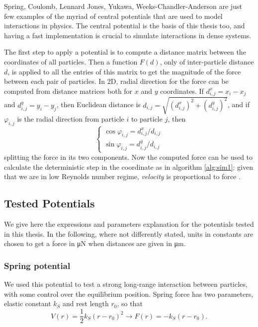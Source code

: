 \documentclass[../../master_thesis_np.tex]{subfiles}
\begin{document}
	Spring, Coulomb, Lennard Jones, Yukawa, Weeks-Chandler-Anderson are just few examples of the myriad of central potentials that are used to model interactions in physics. 
	The central potential is the basis of this thesis too, and having a fast implementation is crucial to simulate interactions in dense systems. 
	
	The first step to apply a potential is to compute a distance matrix between the coordinates of all particles. 
	Then a function $F(d)$, only of inter-particle distance $d$, is applied to all the entries of this matrix to get the magnitude of the force between each pair of particles. 
	In 2D, radial direction for the force can be computed from distance matrices both for $x$ and $y$ coordinates. 
	If $d^x_{i,j} = x_i - x_j$ and $d^y_{i,j} = y_i - y_j$, then Euclidean distance is $d_{i,j} = \sqrt{(d^x_{i,j})^2 + (d^y_{i,j})^2}$, and if $\varphi_{i,j}$ is the radial direction from particle $i$ to particle $j$, then
	\begin{equation}
		\begin{cases}
			\cos\varphi_{i,j} = d^x_{i,j}/d_{i,j}\\
			\sin\varphi_{i,j} = d^y_{i,j}/d_{i,j}
		\end{cases}
	\end{equation}
	splitting the force in its two components.
	Now the computed force can be used to calculate the deterministic step in the coordinate as in algorithm \ref{alg:sim1}: given that we are in low Reynolds number regime, \emph{velocity} is proportional to force . 
	
	\subsection{Tested Potentials}
			
	We give here the expressions and parameters explanation for the potentials tested in this thesis.
	In the following, where not differently stated, units in constants are chosen to get a force in \unit{\micro\newton} when distances are given in \unit{\um}.
	
	\subsubsection{Spring potential}
	We used this potential to test a strong long-range interaction between particles, with some control over the equilibrium position.
	Spring force has two parameters, elastic constant $k_S$ and rest length $r_0$, so that 
	\begin{equation}
		V(r) = \frac{1}{2}k_S (r-r_0)^2 \rightarrow F(r) = -k_S(r-r_0).
	\end{equation}
\end{document}
